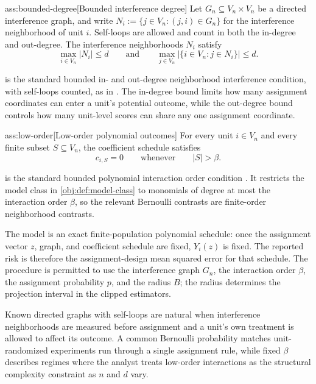 \documentclass[11pt]{article}
\begin{document}
\begin{assumptionv}{ass:bounded-degree}[Bounded interference degree]
Let \(G_n\subseteq V_n\times V_n\) be a directed interference graph, and write \(N_i:=\{j\in V_n:(j,i)\in G_n\}\) for the interference neighborhood of unit \(i\). Self-loops are allowed and count in both the in-degree and out-degree. The interference neighborhoods \(N_i\) satisfy
\[
\max_{i\in V_n}|N_i|\le d
\qquad\text{and}\qquad
\max_{j\in V_n}\bigl|\{i\in V_n:j\in N_i\}\bigr|\le d .
\]
\end{assumptionv}

 is the standard bounded in- and out-degree neighborhood interference condition, with self-loops counted, as in \citet{CortezRodriguezEichhornYu2023}. The in-degree bound limits how many assignment coordinates can enter a unit's potential outcome, while the out-degree bound controls how many unit-level scores can share any one assignment coordinate.

\begin{assumptionv}{ass:low-order}[Low-order polynomial outcomes]
For every unit \(i\in V_n\) and every finite subset \(S\subseteq V_n\), the coefficient schedule satisfies
\[
c_{i,S}=0
\qquad\text{whenever}\qquad
|S|>\beta .
\]
\end{assumptionv}

 is the standard bounded polynomial interaction order condition \citep{CortezRodriguezEichhornYu2023}. It restricts the model class in \cref{obj:def:model-class} to monomials of degree at most the interaction order \(\beta\), so the relevant Bernoulli contrasts are finite-order neighborhood contrasts.

The model is an exact finite-population polynomial schedule: once the assignment vector \(z\), graph, and coefficient schedule are fixed, \(Y_i(z)\) is fixed. The reported risk is therefore the assignment-design mean squared error for that schedule. The procedure is permitted to use the interference graph \(G_n\), the interaction order \(\beta\), the assignment probability \(p\), and the radius \(B\); the radius determines the projection interval in the clipped estimators.

Known directed graphs with self-loops are natural when interference neighborhoods are measured before assignment and a unit's own treatment is allowed to affect its outcome. A common Bernoulli probability matches unit-randomized experiments run through a single assignment rule, while fixed \(\beta\) describes regimes where the analyst treats low-order interactions as the structural complexity constraint as \(n\) and \(d\) vary.
\end{document}
